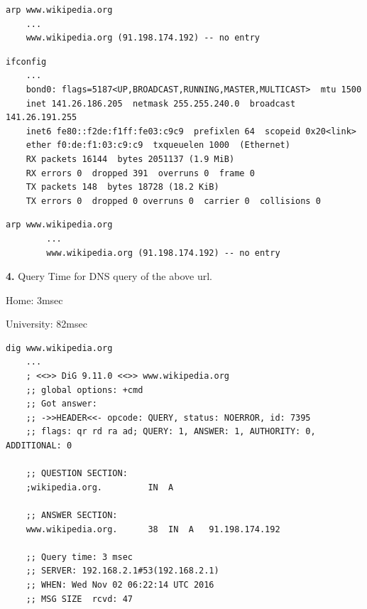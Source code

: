 \documentclass[12pt]{article}
\begin{document}
\begin{lstlisting}[caption=arp www.wikipedia.org home]
	arp www.wikipedia.org
	...
	www.wikipedia.org (91.198.174.192) -- no entry	
\end{lstlisting}

\begin{lstlisting}[caption=ipconfig university]
	ifconfig
	...
	bond0: flags=5187<UP,BROADCAST,RUNNING,MASTER,MULTICAST>  mtu 1500
	inet 141.26.186.205  netmask 255.255.240.0  broadcast 141.26.191.255
	inet6 fe80::f2de:f1ff:fe03:c9c9  prefixlen 64  scopeid 0x20<link>
	ether f0:de:f1:03:c9:c9  txqueuelen 1000  (Ethernet)
	RX packets 16144  bytes 2051137 (1.9 MiB)
	RX errors 0  dropped 391  overruns 0  frame 0
	TX packets 148  bytes 18728 (18.2 KiB)
	TX errors 0  dropped 0 overruns 0  carrier 0  collisions 0
\end{lstlisting}

\begin{lstlisting}[caption=arp www.wikipedia.org university]
        arp www.wikipedia.org
        ...
        www.wikipedia.org (91.198.174.192) -- no entry  
\end{lstlisting}

\textbf{4.} Query Time for DNS query of the above url.

Home: 3msec

University: 82msec

\begin{lstlisting}[caption=dig home]
	dig www.wikipedia.org
	...
	; <<>> DiG 9.11.0 <<>> www.wikipedia.org
	;; global options: +cmd
	;; Got answer:
	;; ->>HEADER<<- opcode: QUERY, status: NOERROR, id: 7395
	;; flags: qr rd ra ad; QUERY: 1, ANSWER: 1, AUTHORITY: 0, ADDITIONAL: 0

	;; QUESTION SECTION:
	;wikipedia.org.			IN	A

	;; ANSWER SECTION:
	www.wikipedia.org.		38	IN	A	91.198.174.192

	;; Query time: 3 msec
	;; SERVER: 192.168.2.1#53(192.168.2.1)
	;; WHEN: Wed Nov 02 06:22:14 UTC 2016
	;; MSG SIZE  rcvd: 47
\end{lstlisting}
\end{document}
